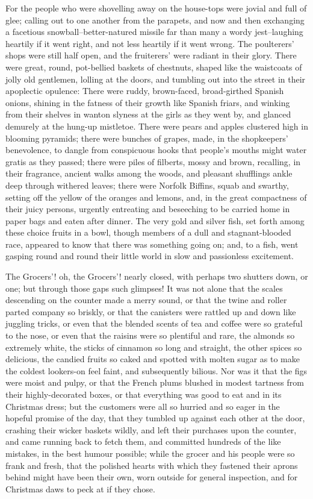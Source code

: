 For the people who were shovelling away on the house-tops were jovial
and full of glee; calling out to one another from the parapets, and now
and then exchanging a facetious snowball--better-natured missile far
than many a wordy jest--laughing heartily if it went right, and not less
heartily if it went wrong. The poulterers' shops were still half open,
and the fruiterers' were radiant in their glory. There were great,
round, pot-bellied baskets of chestnuts, shaped like the waistcoats of
jolly old gentlemen, lolling at the doors, and tumbling out into the
street in their apoplectic opulence: There were ruddy, brown-faced,
broad-girthed Spanish onions, shining in the fatness of their growth
like Spanish friars, and winking from their shelves in wanton slyness at
the girls as they went by, and glanced demurely at the hung-up
mistletoe. There were pears and apples clustered high in blooming
pyramids; there were bunches of grapes, made, in the shopkeepers'
benevolence, to dangle from conspicuous hooks that people's mouths might
water gratis as they passed; there were piles of filberts, mossy and
brown, recalling, in their fragrance, ancient walks among the woods, and
pleasant shufflings ankle deep through withered leaves; there were
Norfolk Biffins, squab and swarthy, setting off the yellow of the
oranges and lemons, and, in the great compactness of their juicy
persons, urgently entreating and beseeching to be carried home in paper
bags and eaten after dinner. The very gold and silver fish, set forth
among these choice fruits in a bowl, though members of a dull and
stagnant-blooded race, appeared to know that there was something going
on; and, to a fish, went gasping round and round their little world in
slow and passionless excitement.

The Grocers'! oh, the Grocers'! nearly closed, with perhaps two shutters
down, or one; but through those gaps such glimpses! It was not alone
that the scales descending on the counter made a merry sound, or that
the twine and roller parted company so briskly, or that the canisters
were rattled up and down like juggling tricks, or even that the blended
scents of tea and coffee were so grateful to the nose, or even that the
raisins were so plentiful and rare, the almonds so extremely white, the
sticks of cinnamon so long and straight, the other spices so delicious,
the candied fruits so caked and spotted with molten sugar as to make the
coldest lookers-on feel faint, and subsequently bilious. Nor was it that
the figs were moist and pulpy, or that the French plums blushed in
modest tartness from their highly-decorated boxes, or that everything
was good to eat and in its Christmas dress; but the customers were all
so hurried and so eager in the hopeful promise of the day, that they
tumbled up against each other at the door, crashing their wicker baskets
wildly, and left their purchases upon the counter, and came running
back to fetch them, and committed hundreds of the like mistakes, in the
best humour possible; while the grocer and his people were so frank and
fresh, that the polished hearts with which they fastened their aprons
behind might have been their own, worn outside for general inspection,
and for Christmas daws to peck at if they chose.

